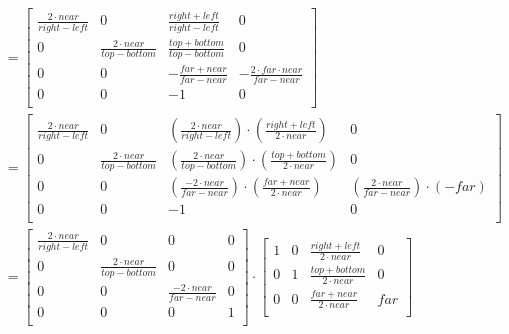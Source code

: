 \documentclass{article}
\begin{document}
\begin{equation*}
\begin{split}
    \\&=
    \begin{bmatrix}
        \frac{2\cdot near}{right-left} &
        0 & \frac{right+left}{right-left} & 0\\
        0 &
        \frac{2\cdot near}{top-bottom} & \frac{top+bottom}{top-bottom} & 0\\
        0 &
        0 &
        -\frac{far+near}{far-near} & -\frac{2\cdot far\cdot near}{far-near}\\
        0 & 0 & -1 & 0\\    
    \end{bmatrix}
    \\&=
    \begin{bmatrix}
        \frac{2\cdot near}{right-left} &
        0 & 
        \left(\frac{2 \cdot near}{right-left}\right)\cdot
        \left(\frac{right+left}{2\cdot near}\right)
        & 0\\
        0 &
        \frac{2\cdot near}{top-bottom} &
        \left(\frac{2 \cdot near}{top-bottom}\right)\cdot
        \left(\frac{top+bottom}{2\cdot near}\right)
        & 0\\
        0 &
        0 &
        \left(\frac{-2 \cdot near}{far-near}\right)\cdot
        \left(\frac{far+near}{2\cdot near}\right)
        & \left(\frac{2\cdot near}{far-near}\right)\cdot\left(-far\right)\\
        0 & 0 & -1 & 0\\    
    \end{bmatrix}
    \\&=
    \begin{bmatrix}
        \frac{2\cdot near}{right-left} &
        0 & 0 & 0\\
        0 &
        \frac{2\cdot near}{top-bottom} & 0
        & 0\\
        0 & 0 &
        \frac{-2 \cdot near}{far-near} & 0\\
        0 & 0 & 0 & 1\\    
    \end{bmatrix}\cdot
    \begin{bmatrix}
        1 &
        0 & 
        \frac{right+left}{2\cdot near}
        & 0\\
        0 &
        1 &
        \frac{top+bottom}{2\cdot near}
        & 0\\
        0 & 0 &
        \frac{far+near}{2\cdot near}
        & far\\

\end{bmatrix}
\end{split}
\end{equation*}
\end{document}
